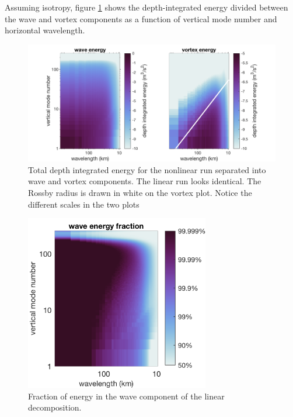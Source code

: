\documentclass[10pt]{article}
\begin{document}
Assuming isotropy, figure \ref{Energy-nonlinear} shows the depth-integrated energy divided between the wave and vortex components as a function of vertical mode number and horizontal wavelength. 

\begin{figure}[t]
  \centerline{\includegraphics[width=39pc,angle=0]{figures/Energy-nonlinear}}
  \caption{Total depth integrated energy for the nonlinear run separated into wave and vortex components. The linear run looks identical. The Rossby radius is drawn in white on the vortex plot. Notice the different scales in the two plots}
  \label{Energy-nonlinear}
\end{figure}

\begin{figure}[t]
  \centerline{\includegraphics[width=19pc,angle=0]{figures/EnergyFraction-nonlinear}}
  \caption{Fraction of energy in the wave component of the linear decomposition. }
  \label{EnergyFraction-nonlinear}
\end{figure}
\end{document}
